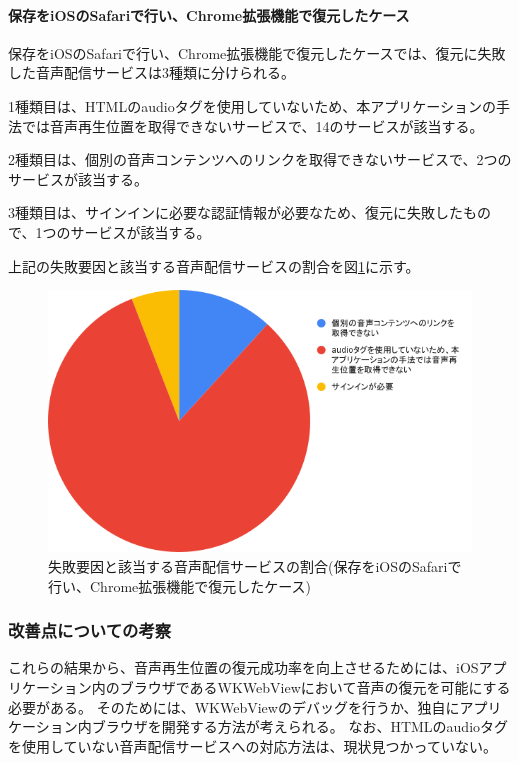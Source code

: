 \paragraph{保存をiOSのSafariで行い、Chrome拡張機能で復元したケース}
保存をiOSのSafariで行い、Chrome拡張機能で復元したケースでは、復元に失敗した音声配信サービスは3種類に分けられる。

1種類目は、HTMLのaudioタグを使用していないため、本アプリケーションの手法では音声再生位置を取得できないサービスで、14のサービスが該当する。

2種類目は、個別の音声コンテンツへのリンクを取得できないサービスで、2つのサービスが該当する。

3種類目は、サインインに必要な認証情報が必要なため、復元に失敗したもので、1つのサービスが該当する。

上記の失敗要因と該当する音声配信サービスの割合を図\ref{fig:evl-consideration-audio-cause-ratio-ios-chrome}に示す。

\begin{figure}[htbp]
  \caption{失敗要因と該当する音声配信サービスの割合(保存をiOSのSafariで行い、Chrome拡張機能で復元したケース)}
  \label{fig:evl-consideration-audio-cause-ratio-ios-chrome}
  \begin{center}
    \includegraphics[bb=0 0 600 371,width=15cm]{img/060_evaluation/consideration/audio/cause-ratio-ios-chrome.pdf}
  \end{center}
\end{figure}

\subsubsection{改善点についての考察}
これらの結果から、音声再生位置の復元成功率を向上させるためには、iOSアプリケーション内のブラウザであるWKWebViewにおいて音声の復元を可能にする必要がある。
そのためには、WKWebViewのデバッグを行うか、独自にアプリケーション内ブラウザを開発する方法が考えられる。
なお、HTMLのaudioタグを使用していない音声配信サービスへの対応方法は、現状見つかっていない。